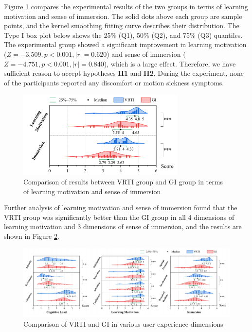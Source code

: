 \documentclass[runningheads]{llncs}
\begin{document}
Figure \ref{fig:user-experience-result} compares the experimental results of the two groups in terms of learning motivation and sense of immersion. The solid dots above each group are sample points, and the kernel smoothing fitting curve describes their distribution. The Type I box plot below shows the 25\% (Q1), 50\% (Q2), and 75\% (Q3) quantiles. The experimental group showed a significant improvement in learning motivation (\(Z=-3.509,p<0.001,|r|=0.620\)) and sense of immersion (\(Z=-4.751,p<0.001,|r|=0.840\)), which is a large effect. Therefore, we have sufficient reason to accept hypotheses \textbf{H1} and \textbf{H2}. During the experiment, none of the participants reported any discomfort or motion sickness symptoms.

\begin{figure}[t]
  \centering
  \includegraphics[width=0.75\textwidth]{image/user-experience-result.pdf}
  \caption{Comparison of results between VRTI group and GI group in terms of learning motivation and sense of immersion}
  \label{fig:user-experience-result}
\end{figure}

Further analysis of learning motivation and sense of immersion found that the VRTI group was significantly better than the GI group in all 4 dimensions of learning motivation and 3 dimensions of sense of immersion, and the results are shown in Figure \ref{fig:three-user-experience-result}.

\begin{figure}[t]
  \centering
  \includegraphics[width=\textwidth]{image/three-user-experience-result.pdf}
  \caption{Comparison of VRTI and GI in various user experience dimensions}
  \label{fig:three-user-experience-result}
\end{figure}
\end{document}

